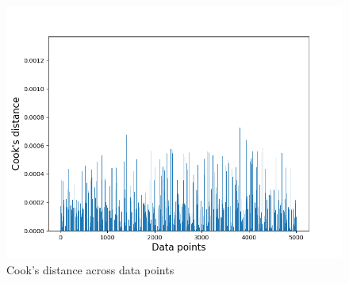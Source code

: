 \documentclass[9pt]{IEEEtran}
\begin{document}
\begin{figure}[H]
    \centering
    \includegraphics[width=0.9\columnwidth]{figures/cook.png}
    \caption{Cook's distance across data points}
    \label{fig:cook}
\end{figure}
\end{document}
